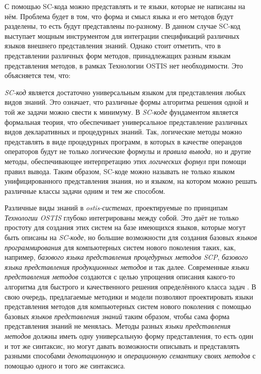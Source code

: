 С помощью SC-кода можно представлять и те языки, которые не написаны на нём. Проблема будет в том, что форма и смысл языка и его методов будут разделены, то есть будут представлены по-разному. В данном случае SC-код выступает мощным инструментом для интеграции спецификаций различных языков внешнего представления знаний. Однако стоит отметить, что в представлении различных форм методов, принадлежащих разным языкам представления методов, в рамках Технологии OSTIS нет необходимости. Это объясняется тем, что:
\begin{textitemize}
    \item \textit{SC-код} является достаточно универсальным языком для представления любых видов знаний. Это означает, что различные формы алгоритма решения одной и той же задачи можно свести к минимуму. В \textit{SC-коде} фундаментом является формальная теория, что обеспечивает универсальное представление различных видов декларативных и процедурных знаний. Так, логические методы можно представлять в виде процедурных программ, в которых в качестве операндов операторов будут не только логические формулы и \textit{правила вывода}, но и другие методы, обеспечивающее интерпретацию этих \textit{логических формул} при помощи правил вывода. Таким образом, SC-коде можно называть не только языком унифицированного представления знания, но и языком, на котором можно решать различные классы задачи одним и тем же способом.
    \item Различные виды знаний в \textit{ostis-системах}, проектируемые по принципам \textit{Технологии OSTIS} глубоко интегрированы между собой. Это даёт не только простоту для создания этих систем на базе имеющихся языков, которые могут быть описаны на \textit{SC-коде}, но большие возможности для создания базовых \textit{языков программирования} для компьютерных систем нового поколения таких, как, например, \textit{базового языка представления процедурных методов SCP}, \textit{базового языка представления продукционных методов} и так далее. Современные \textit{языки представления методов} создаются с целью упрощения описания какого-то алгоритма для быстрого и качественного решения определённого класса задач \cite{Benri2000}. В свою очередь, предлагаемые методики и модели позволяют проектировать языки представления методов для компьютерных систем нового поколения с помощью базовых \textit{языков представления знаний} таким образом, чтобы сама форма представления знаний не менялась. Методы разных \textit{языки представления методов} должны иметь одну универсальную форму представления, то есть один и тот же синтаксис, но могут давать возможности описывать и представлять разными способами \textit{денотационную} и \textit{операционную семантику} своих \textit{методов} с помощью одного и того же синтаксиса.

\end{textitemize}
